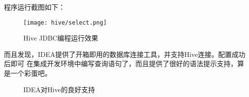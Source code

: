 程序运行截图如下：

\begin{figure}[h]
  \centering
  \texttt{[image: hive/select.png]}
  \caption{Hive JDBC编程运行效果}
  \label{fig:hive-jdbc}
\end{figure}

而且发现，IDEA提供了开箱即用的数据库连接工具，并支持Hive连接。配置成功后即可
在集成开发环境中编写查询语句了，而且提供了很好的语法提示支持，算是一个彩蛋吧。

\begin{figure}[htbp]
  \centering
  \caption{IDEA对Hive的良好支持}
\end{figure}
